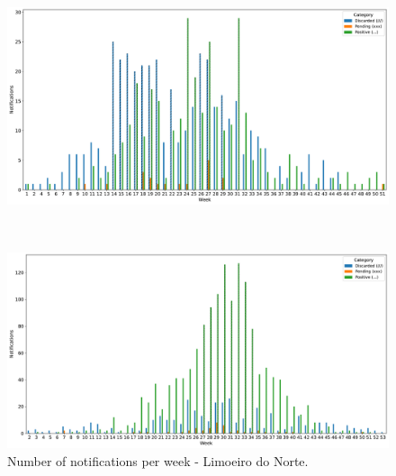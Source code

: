 \begin{figure}[h!]
  \begin{minipage}[c]{.9\textwidth}
    \centering
    \includegraphics[scale=0.32]{images/cases-per-week--2019-Limoeiro do Norte.pdf}
  \end{minipage}
  \\
  \begin{minipage}[c]{.9\textwidth}
    \centering
    \includegraphics[scale=0.32]{images/cases-per-week--2020-Limoeiro do Norte.pdf}
  \end{minipage}
  \caption{\label{fig:cases-per-week-limoeiro} Number of notifications per week - Limoeiro do Norte.}
\end{figure}

